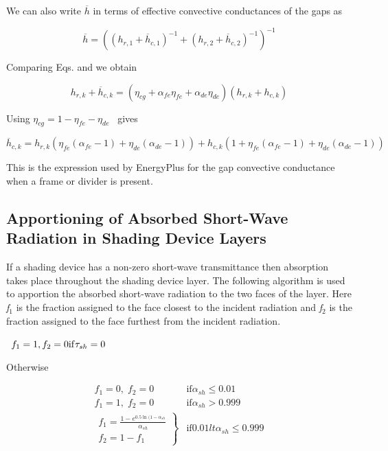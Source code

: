 We can also write \(\overline h\) in terms of effective convective conductances of the gaps as

\begin{equation}
\overline h  = {\left( {{{\left( {{h_{r,1}} + {{\overline h }_{c,1}}} \right)}^{ - 1}} + {{\left( {{h_{r,2}} + {{\overline h }_{c,2}}} \right)}^{ - 1}}} \right)^{ - 1}}
\end{equation}

Comparing Eqs. and we obtain

\begin{equation}
{h_{r,k}} + {\overline h_{c,k}} = \left( {{\eta_{cg}} + {\alpha_{fe}}{\eta_{fe}} + {\alpha_{de}}{\eta_{de}}} \right)\left( {{h_{r,k}} + {h_{c,k}}} \right)
\end{equation}

Using \({\eta_{cg}} = 1 - {\eta_{fe}} - {\eta_{de}}\) ~gives

\begin{equation}
{\overline h_{c,k}} = {h_{r,k}}\left( {{\eta_{fe}}\left( {{\alpha_{fe}} - 1} \right) + {\eta_{de}}\left( {{\alpha_{de}} - 1} \right)} \right) + {h_{c,k}}\left( {1 + {\eta_{fe}}\left( {{\alpha_{fe}} - 1} \right) + {\eta_{de}}\left( {{\alpha_{de}} - 1} \right)} \right)
\end{equation}

This is the expression used by EnergyPlus for the gap convective conductance when a frame or divider is present.

\subsection{Apportioning of Absorbed Short-Wave Radiation in Shading Device Layers}\label{apportioning-of-absorbed-short-wave-radiation-in-shading-device-layers}

If a shading device has a non-zero short-wave transmittance then absorption takes place throughout the shading device layer. The following algorithm is used to apportion the absorbed short-wave radiation to the two faces of the layer. Here \emph{f\(_{1}\)} is the fraction assigned to the face closest to the incident radiation and \emph{f\(_{2}\)} is the fraction assigned to the face furthest from the incident radiation.

~\({f_1} = 1,{\rm{ }}{f_2} = 0{\rm{ if }}{\tau_{sh}} = 0\)

Otherwise

\begin{equation}
  \begin{array}{cl}
    f_1 = 0,\;f_2 = 0 &\text{if} \alpha_{sh} \le 0.01 \\
    f_1 = 1,\;f_2 = 0 &\text{if} \alpha_{sh} > 0.999 \\
    \left.
      \begin{array}{l}
        f_1 = \frac{1 - e^{0.5 \ln (1 - \alpha_{sh}}} {\alpha_{sh}} \\
        f_2 = 1 - {f_1}
      \end{array}
    \right\} &\text{if} 0.01 lt \alpha_{sh} \le 0.999
  \end{array}
\end{equation}

